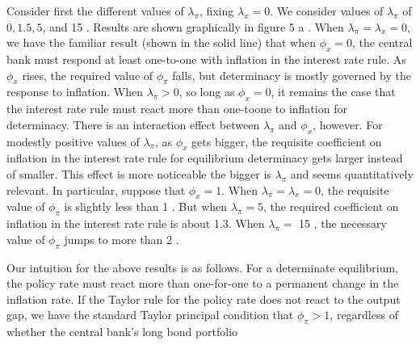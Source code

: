 \documentclass[10pt]{article}
\begin{document}
Consider first the different values of $\lambda_{\pi}$, fixing $\lambda_{x}=0$. We consider values of $\lambda_{\pi}$ of $0,1.5,5$, and 15 . Results are shown graphically in figure 5 a . When $\lambda_{\pi}=\lambda_{x}=0$, we have the familiar result (shown in the solid line) that when $\phi_{x}=0$, the central bank must respond at least one-to-one with inflation in the interest rate rule. As $\phi_{x}$ rises, the required value of $\phi_{\pi}$ falls, but determinacy is mostly governed by the response to inflation. When $\lambda_{\pi}>0$, so long as $\phi_{x}=0$, it remains the case that the interest rate rule must react more than one-toone to inflation for determinacy. There is an interaction effect between $\lambda_{\pi}$ and $\phi_{x}$, however. For modestly positive values of $\lambda_{\pi}$, as $\phi_{x}$ gets bigger, the requisite coefficient on inflation in the interest rate rule for equilibrium determinacy gets larger instead of smaller. This effect is more noticeable the bigger is $\lambda_{\pi}$ and seems quantitatively relevant. In particular, suppose that $\phi_{x}=1$. When $\lambda_{\pi}=\lambda_{x}=0$, the requisite value of $\phi_{\pi}$ is slightly less than 1 . But when $\lambda_{\pi}=5$, the required coefficient on inflation in the interest rate rule is about 1.3. When $\lambda_{\pi}=$ 15 , the necessary value of $\phi_{\pi}$ jumps to more than 2 .

Our intuition for the above results is as follows. For a determinate equilibrium, the policy rate must react more than one-for-one to a permanent change in the inflation rate. If the Taylor rule for the policy rate does not react to the output gap, we have the standard Taylor principal condition that $\phi_{\pi}>1$, regardless of whether the central bank's long bond portfolio
\end{document}
